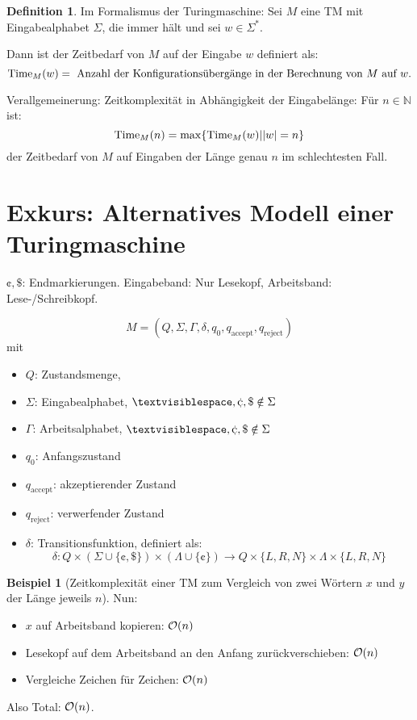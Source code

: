 \documentclass[11pt]{article} %
\theoremstyle{definition}
\newtheorem*{beispiel}{Beispiel}
\newtheorem{definition}{Definition}
\begin{document}
\begin{definition}

Im Formalismus der Turingmaschine: Sei $M$ eine TM mit Eingabealphabet $\Sigma$, die immer hält und sei $w \in \Sigma^*$.

Dann ist der Zeitbedarf von $M$ auf der Eingabe $w$ definiert als:
\[
\operatorname{Time}_M(w) = \textrm{ Anzahl der Konfigurationsübergänge in der Berechnung von $M$ auf $w$.}
\]

Verallgemeinerung: Zeitkomplexität in Abhängigkeit der Eingabelänge: Für $n \in \mathbb{N}$ ist:
\[
\operatorname{Time}_M(n) = \operatorname{max}\{ \operatorname{Time}_M(w) | |w| = n \}
\]
der Zeitbedarf von $M$ auf Eingaben der Länge genau $n$ im schlechtesten Fall.

\end{definition}

\section{Exkurs: Alternatives Modell einer Turingmaschine}

$\cent, \$$: Endmarkierungen. Eingabeband: Nur Lesekopf, Arbeitsband: Lese-/Schreibkopf.

\[
M = (Q, \Sigma, \Gamma, \delta, q_0, q_\textrm{accept}, q_\textrm{reject})
\]
mit
\begin{itemize}
\item $Q$: Zustandsmenge,
\item $\Sigma$: Eingabealphabet, $\textvisiblespace, \cent, \$ \notin \Sigma$
\item $\Gamma$: Arbeitsalphabet, $\textvisiblespace, \cent, \$ \notin \Sigma$
\item $q_0$: Anfangszustand
\item $q_\textrm{accept}$: akzeptierender Zustand
\item $q_\textrm{reject}$: verwerfender Zustand
\item $\delta$: Transitionsfunktion, definiert als:
\[
\delta: Q \times (\Sigma \cup \{\cent, \$\}) \times (\Lambda \cup \{\cent\}) \rightarrow Q \times \{L, R, N \} \times \Lambda \times \{L,R,N\}
\]
\end{itemize}

\begin{beispiel}[Zeitkomplexität einer TM zum Vergleich von zwei Wörtern $x$ und $y$ der Länge jeweils $n$]

Nun:
\begin{itemize}
\item $x$ auf Arbeitsband kopieren: $\mathcal{O}(n)$
\item Lesekopf auf dem Arbeitsband an den Anfang zurückverschieben: $\mathcal{O}(n)$
\item Vergleiche Zeichen für Zeichen: $\mathcal{O}(n)$
\end{itemize}
Also Total: $\mathcal{O}(n)$.

\end{beispiel}
\end{document}
